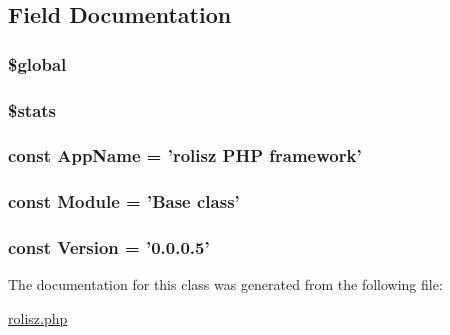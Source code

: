 \subsection{Field Documentation}
\hypertarget{classbase_aad844777d9d6beb4ca7c92d97afe7d27}{
\subsubsection[{\$global}]{\setlength{\rightskip}{0pt plus 5cm}\$global}}
\label{classbase_aad844777d9d6beb4ca7c92d97afe7d27}
\hypertarget{classbase_ac61adefb58583938c9b820405ddfa018}{
\subsubsection[{\$stats}]{\setlength{\rightskip}{0pt plus 5cm}\$stats}}
\label{classbase_ac61adefb58583938c9b820405ddfa018}
\hypertarget{classbase_aab75444b144ffc4e972a9170e0a76ec0}{
\subsubsection[{AppName}]{\setlength{\rightskip}{0pt plus 5cm}const {\bf AppName} = '{\bf rolisz} PHP framework'}}
\label{classbase_aab75444b144ffc4e972a9170e0a76ec0}
\hypertarget{classbase_a2c348358c1db4bb5136855f7f31e1157}{
\subsubsection[{Module}]{\setlength{\rightskip}{0pt plus 5cm}const {\bf Module} = 'Base class'}}
\label{classbase_a2c348358c1db4bb5136855f7f31e1157}
\hypertarget{classbase_a62e44de9100d83ee01f5b4875b49a02b}{
\subsubsection[{Version}]{\setlength{\rightskip}{0pt plus 5cm}const {\bf Version} = '0.0.0.5'}}
\label{classbase_a62e44de9100d83ee01f5b4875b49a02b}


The documentation for this class was generated from the following file:\begin{DoxyCompactItemize}
\item 
\hyperlink{rolisz_8php}{rolisz.php}\end{DoxyCompactItemize}
